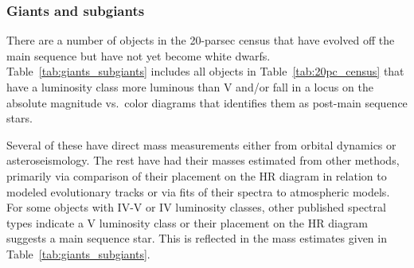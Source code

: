\documentclass[twocolumn,tighten,twocolappendix]{aastex631}
\begin{document}
\subsubsection{Giants and subgiants\label{sec:subgiants-giants}}

There are a number of objects in the 20-parsec census that have evolved off the main sequence but have not yet become white dwarfs. Table~\ref{tab:giants_subgiants} includes all objects in Table~\ref{tab:20pc_census} that have a luminosity class more luminous than V and/or fall in a locus on the absolute magnitude vs.\ color diagrams that identifies them as post-main sequence stars. 

Several of these have direct mass measurements either from orbital dynamics or asteroseismology. The rest have had their masses estimated from other methods, primarily via comparison of their placement on the HR diagram in relation to modeled evolutionary tracks or via fits of their spectra to atmospheric models. For some objects with IV-V or IV luminosity classes, other published spectral types indicate a V luminosity class or their placement on the HR diagram suggests a main sequence star. This is reflected in the mass estimates given in Table~\ref{tab:giants_subgiants}. 
\end{document}
